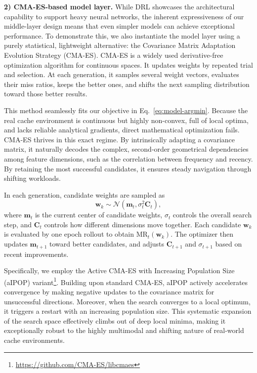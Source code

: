\documentclass[10pt,journal]{IEEEtran}
\theoremstyle{slantedlemma}
\begin{document}
\textbf{2) CMA-ES-based model layer.}
While DRL showcases the architectural capability to support heavy neural networks, the inherent expressiveness of our middle-layer design means that even simpler models can achieve exceptional performance. To demonstrate this, we also instantiate the model layer using a purely statistical, lightweight alternative: the Covariance Matrix Adaptation Evolution Strategy (CMA-ES). CMA-ES is a widely used derivative-free optimization algorithm for continuous spaces. It updates weights by repeated trial and selection.
At each generation, it samples several weight vectors, evaluates their miss
ratios, keeps the better ones, and shifts the next sampling distribution toward
those better results.

This method seamlessly fits our objective in Eq.~\ref{eq:model-argmin}.
Because the real cache environment is continuous but highly non-convex, full of
local optima, and lacks reliable analytical gradients, direct mathematical
optimization fails. CMA-ES thrives in this exact regime.
By intrinsically adapting a covariance matrix, it naturally decodes the complex,
second-order geometrical dependencies among feature dimensions, such as the
correlation between frequency and recency. By retaining the most successful
candidates, it ensures steady navigation through shifting workloads.


In each generation, candidate weights are sampled as
\begin{equation}
\mathbf{w}_k \sim \mathcal{N}(\mathbf{m}_t,\sigma_t^2\mathbf{C}_t),
\label{eq:cma-sample}
\end{equation}
where $\mathbf{m}_t$ is the current center of candidate weights, $\sigma_t$ controls the overall search step, and $\mathbf{C}_t$ controls how different dimensions move together.
Each candidate $\mathbf{w}_k$ is evaluated by one epoch rollout to obtain
$\mathrm{MR}_t(\mathbf{w}_k)$.
The optimizer then updates $\mathbf{m}_{t+1}$ toward better candidates, and
adjusts $\mathbf{C}_{t+1}$ and $\sigma_{t+1}$ based on recent improvements.

Specifically, we employ the Active CMA-ES with Increasing Population Size (aIPOP) variant\footnote{\url{https://github.com/CMA-ES/libcmaes}}. Building upon standard CMA-ES, aIPOP actively accelerates convergence by making negative updates to the covariance matrix for unsuccessful directions. Moreover, when the search converges to a local optimum, it triggers a restart with an increasing population size. This systematic expansion of the search space effectively climbs out of deep local minima, making it exceptionally robust to the highly multimodal and shifting nature of real-world cache environments.
\end{document}
